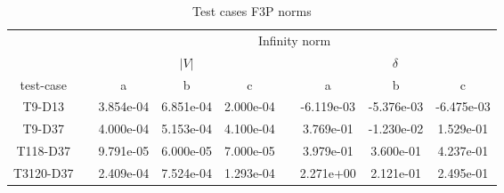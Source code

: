 \begin{table}
\renewcommand{\arraystretch}{1.3}
\centering
\label{}\hspace{2cm}\caption{Test cases F3P norms}
\begin{adjustbox}{width=1\textwidth} %
\small
\begin{tabular}{ccccccccc}
\toprule
{} && \multicolumn{7}{c}{Infinity norm}   \\
\cmidrule{3-9}
{} && \multicolumn{3}{c}{$|V|$} && \multicolumn{3}{c}{$\delta$}  \\
\cmidrule{3-5}\cmidrule{7-9}
 test-case &&        a &        b &       c &&        a &       b &        c \\
\midrule
T9-D13    &&  3.854e-04 &  6.851e-04 &  2.000e-04 &&  -6.119e-03 &  -5.376e-03 &  -6.475e-03 \\
T9-D37    &&  4.000e-04 &  5.153e-04 &  4.100e-04 &&   3.769e-01 &  -1.230e-02 &   1.529e-01 \\
T118-D37  &&  9.791e-05 &  6.000e-05 &  7.000e-05 &&   3.979e-01 &   3.600e-01 &   4.237e-01 \\
T3120-D37 &&  2.409e-04 &  7.524e-04 &  1.293e-04 &&   2.271e+00 &   2.121e-01 &   2.495e-01 \\
\bottomrule
\end{tabular}
\end{adjustbox}
\end{table}